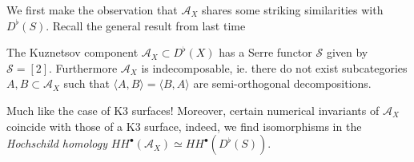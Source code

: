 We first make the observation that $\mathcal{A}_X$ shares some striking similarities with $D^{\flat}( S) $. Recall the general result from last time
\begin{propo}[Kuznetsov]
The Kuznetsov component $\mathcal{A}_X \subset D^{\flat}( X)$ has a Serre functor $\mathcal{S}$  given by $\mathcal{S}= [ 2]$.
Furthermore $\mathcal{A}_X$ is indecomposable, ie. there do not exist subcategories $A,B \subset \mathcal{A}_X$ such that $\langle A,B\rangle = \langle B,A\rangle$ are semi-orthogonal decompositions.
\end{propo}
Much like the case of K3 surfaces!
Moreover, certain numerical invariants of $\mathcal{A}_X$ coincide with those of a K3 surface, indeed, we find isomorphisms in the \textit{Hochschild homology} $HH^{\bullet}( \mathcal{A}_X) \simeq HH^{\bullet}( D^{\flat}( S) ) $.
